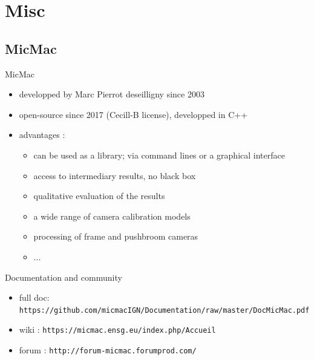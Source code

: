 \documentclass{beamer}
\begin{document}
	\section{Misc} 

		\subsection*{MicMac}
		\begin{frame}{MicMac}
			\begin{itemize}
			\item developped by Marc Pierrot deseilligny since 2003
			\item open-source since 2017 (Cecill-B license), developped in C++
			\item advantages :
				\begin{itemize}
				\item can be used as a library; via command lines or a graphical interface 
				\item access to intermediary results, no black box
				\item qualitative evaluation of the results
				\item a wide range of camera calibration models
				\item processing of frame and pushbroom cameras
				\item ...
		
				\end{itemize}
			\end{itemize}
		\end{frame}		 

		\begin{frame}{Documentation and community}
		\begin{itemize}
		\item \footnotesize full doc: \texttt{https://github.com/micmacIGN/Documentation/raw/master/DocMicMac.pdf}
		\item \footnotesize wiki : \texttt{https://micmac.ensg.eu/index.php/Accueil}
		\item \footnotesize forum : \texttt{http://forum-micmac.forumprod.com/}
		\end{itemize}
		\end{frame}
\end{document}
